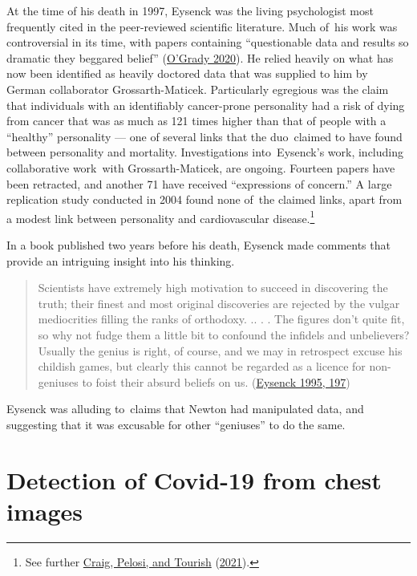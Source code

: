 \documentclass[
  10pt,
  b5paper]{book}
\begin{document}
At the time of his death in 1997, Eysenck was the living psychologist
most frequently cited in the peer-reviewed scientific literature.
Much of~his work was controversial in its time, with papers
containing ``questionable data and results so dramatic they beggared
belief'' (\protect\hyperlink{ref-o2020famous}{O'Grady 2020}). He relied heavily on what has now been
identified as heavily doctored data that was supplied to him by
German collaborator Grossarth-Maticek. Particularly egregious was
the claim that individuals with an identifiably cancer-prone personality
had a risk of dying from cancer that was as much as 121 times higher
than that of people with a ``healthy'' personality --- one of several
links that the duo~claimed to have found between personality and
mortality. Investigations into~Eysenck's work, including
collaborative work~with Grossarth-Maticek, are ongoing. Fourteen
papers have been retracted, and another 71 have received
``expressions of concern.'' A large replication study conducted in
2004 found none of~the claimed links, apart from a modest link between
personality and cardiovascular disease.\footnote{See further \protect\hyperlink{ref-CraigEtAl}{Craig, Pelosi, and Tourish} (\protect\hyperlink{ref-CraigEtAl}{2021}).}

In a book published two years before his death, Eysenck made
comments that provide an intriguing insight into his thinking.

\begin{quote}
Scientists have extremely high motivation to succeed in discovering the truth; their finest and most original discoveries are rejected by the vulgar mediocrities filling the ranks of orthodoxy. .. . . The figures don't quite fit, so why not fudge them a little bit to confound the infidels and unbelievers? Usually the genius is right, of course, and we may in retrospect excuse his childish games, but clearly this cannot be regarded as a licence for non-geniuses to foist their absurd beliefs on us. (\protect\hyperlink{ref-eysenck1995genius}{Eysenck 1995, 197})
\end{quote}

Eysenck was alluding to~claims that Newton had manipulated data, and
suggesting that it was excusable for other ``geniuses'' to do the same.

\hypertarget{detection-of-covid-19-from-chest-images}{%
\section{Detection of Covid-19 from chest images}\label{detection-of-covid-19-from-chest-images}}
\end{document}
